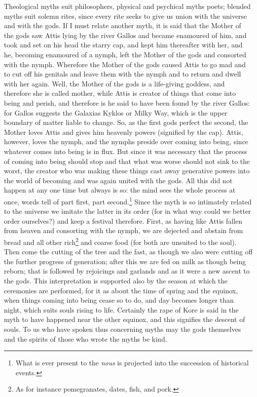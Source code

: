 \documentclass[12pt]{article}
\begin{document}
Theological myths suit philosophers, physical and psychical myths poets;
blended myths suit solemn rites, since every rite seeks to give us union with
the universe and with the gods. If I must relate another myth, it is said that
the Mother of the gods saw Attis lying by the river Gallos and became enamoured
of him, and took and set on his head the starry cap, and kept him thereafter
with her, and he, becoming enamoured of a nymph, left the Mother of the gods
and consorted with the nymph. Wherefore the Mother of the gods caused Attis to
go mad and to cut off his genitals and leave them with the nymph and to return
and dwell with her again. Well, the Mother of the gods is a life-giving
goddess, and therefore she is called mother, while Attis is creator of things
that come into being and perish, and therefore is he said to have been found by
the river Gallos: for Gallos suggests the Galaxias Kyklos or Milky Way, which
is the upper boundary of matter liable to change. So, as the first gods
perfect the second, the Mother loves Attis and gives him heavenly powers
(signified by the cap). Attis, however, loves the nymph, and the nymphs
preside over coming into being, since whatever comes into being is in flux. But
since it was necessary that the process of coming into being should stop and
that what was worse should not sink to the worst, the creator who was making
these things cast away generative powers into the world of becoming and was
again united with the gods. All this did not happen at any one time but always
is so: the mind sees the whole process at once, words tell of part first, part
second.\footnote{What is ever present to the \textit{nous} is projected into
the succession of historical events.} Since the myth is so intimately related
to the universe we imitate the latter in its order (for in what way could we
better order ourselves?) and keep a festival therefore. First, as having like
Attis fallen from heaven and consorting with the nymph, we are dejected and
abstain from bread and all other rich\footnote{As for instance pomegranates,
dates, fish, and pork.} and coarse food (for both are unsuited to the soul).
Then come the cutting of the tree and the fast, as though we also were cutting
off the further progress of generation; after this we are fed on milk as though
being reborn; that is followed by rejoicings and garlands and as it were a new
ascent to the gods. This interpretation is supported also by the season at
which the ceremonies are performed, for it as about the time of spring and the
equinox, when things coming into being cease so to do, and day becomes longer
than night, which suits souls rising to life. Certainly the rape of Kore is
said in the myth to have happened near the other equinox, and this signifies
the descent of souls. To us who have spoken thus concerning myths may the gods
themselves and the spirits of those who wrote the myths be kind.
\end{document}
